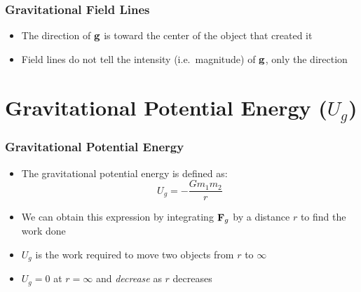 \documentclass[12pt,compress,aspectratio=169]{beamer}
\newcommand{\mb}[1]{\ensuremath\mathbf{#1}}
\begin{document}
\begin{frame}
  \frametitle{Gravitational Field Lines}
  \begin{center}
  \end{center}
  \begin{itemize}
  \item The direction of $\mb{g}$ is toward the center of the object that
    created it
  \item Field lines do not tell the intensity (i.e.\ magnitude) of $\mb{g}$,
    only the direction
  \end{itemize}
\end{frame}




\section[$U_g$]{Gravitational Potential Energy ($U_g$)}


\begin{frame}
  \frametitle{Gravitational Potential Energy}

  \begin{itemize}
  \item The gravitational potential energy is defined as:
    {\Large
      \begin{displaymath}
        \boxed{U_g=-\frac{Gm_1m_2}{r}}
    \end{displaymath}
    }
  \item We can obtain this expression by integrating $\mb{F}_g$ by a distance
    $r$ to find the work done
  \item $U_g$ is the work required to move two objects from $r$ to $\infty$
  \item $U_g=0$ at $r=\infty$ and \emph{decrease} as $r$ decreases
  \end{itemize}
\end{frame}
\end{document}

